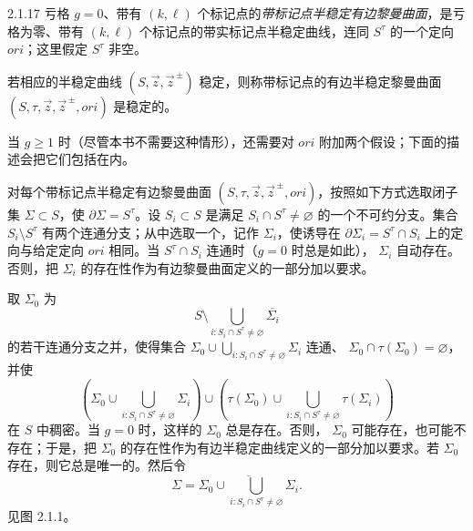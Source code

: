 \begin{definition}{2.1.17}\label{def:2-1-17}
亏格 $g=0$、带有 $(k,\ell)$ 个标记点的\emph{带标记点半稳定有边黎曼曲面}，是亏格为零、带有
$(k,\ell)$ 个标记点的带实标记点半稳定曲线，连同 $S^\tau$ 的一个定向
$\mathit{ori}$；这里假定 $S^\tau$ 非空。

若相应的半稳定曲线 $(S,\vec z,\vec z^{\,\pm})$ 稳定，则称带标记点的有边半稳定黎曼曲面
$(S,\tau,\vec z,\vec z^{\,\pm},\mathit{ori})$ 是稳定的。
\end{definition}

当 $g\geq1$ 时（尽管本书不需要这种情形），还需要对 $\mathit{ori}$ 附加两个假设；下面的描述会把它们包括在内。

对每个带标记点半稳定有边黎曼曲面
$(S,\tau,\vec z,\vec z^{\,\pm},\mathit{ori})$，按照如下方式选取闭子集
$\Sigma\subset S$，使 $\partial\Sigma=S^\tau$。设 $S_i\subset S$ 是满足
$S_i\cap S^\tau\ne\varnothing$ 的一个不可约分支。集合
$S_i\setminus S^\tau$ 有两个连通分支；从中选取一个，记作 $\Sigma_i$，使诱导在
$\partial\Sigma_i=S^\tau\cap S_i$ 上的定向与给定定向
$\mathit{ori}$ 相同。当 $S^\tau\cap S_i$ 连通时（$g=0$ 时总是如此），
$\Sigma_i$ 自动存在。否则，把 $\Sigma_i$ 的存在性作为有边黎曼曲面定义的一部分加以要求。

取 $\Sigma_0$ 为
\[
  S\setminus
  \bigcup_{i:S_i\cap S^\tau\ne\varnothing}\overline{\Sigma_i}
\]
的若干连通分支之并，使得集合
$\Sigma_0\cup\bigcup_{i:S_i\cap S^\tau\ne\varnothing}\Sigma_i$ 连通、
$\Sigma_0\cap\tau(\Sigma_0)=\varnothing$，并使
\[
  \left(
    \Sigma_0\cup
    \bigcup_{i:S_i\cap S^\tau\ne\varnothing}\Sigma_i
  \right)
  \cup
  \left(
    \tau(\Sigma_0)\cup
    \bigcup_{i:S_i\cap S^\tau\ne\varnothing}\tau(\Sigma_i)
  \right)
\]
在 $S$ 中稠密。当 $g=0$ 时，这样的 $\Sigma_0$ 总是存在。否则，
$\Sigma_0$ 可能存在，也可能不存在；于是，把 $\Sigma_0$ 的存在性作为有边半稳定曲线定义的一部分加以要求。若
$\Sigma_0$ 存在，则它总是唯一的。然后令
\[
  \Sigma
  =\overline{
    \Sigma_0\cup
    \bigcup_{i:S_i\cap S^\tau\ne\varnothing}\Sigma_i
  }.
\]
见图 2.1.1。

